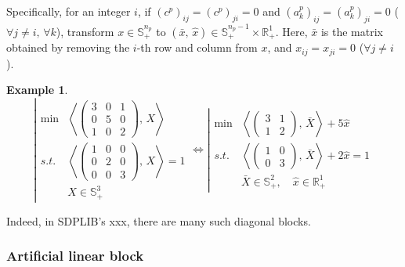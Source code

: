 \documentclass{scrartcl}
\newtheorem{example}{Example}
\newcommand{\inprod}[2]{\left\langle #1, \, #2 \right\rangle}
\begin{document}
Specifically, for an integer $i$,
if $(c^p)_{ij}=(c^p)_{ji}=0$ and $(a^p_k)_{ij}=(a^p_k)_{ji}=0$ 
($\forall j\neq i,\,\forall k$),
transform $x\in \mathbb{S}^{n_p}_+$ to $(\bar{x},\,\hat{x})\in \mathbb{S}^{n_p-1}_+\times \mathbb{R}^1_+$.
Here, $\bar{x}$ is the matrix obtained by removing the $i$-th row and column from $x$, and $x_{ij}= x_{ji}=0$ ($\forall j\neq i$).

\begin{example}
\begin{equation*}
    \left|
    \begin{array}{cl}
        \min & \inprod{\begin{pmatrix}
            3 & 0 & 1 \\
            0 & 5 & 0 \\
            1 & 0 & 2
        \end{pmatrix}}{X} \\
        s.t. 
        & \inprod{\begin{pmatrix}
            1 & 0 & 0 \\ 
            0 & 2 & 0 \\ 
            0 & 0 & 3
        \end{pmatrix}}{X} = 1 \\
        & X\in \mathbb{S}^3_+ 
    \end{array}
    \right.
    \Longleftrightarrow
    \left|
    \begin{array}{cl}
        \min & \inprod{\begin{pmatrix}
            3 & 1 \\
            1 & 2
        \end{pmatrix}}{\bar{X}} + 5\hat{x} \\
        s.t. 
        & \inprod{\begin{pmatrix}
            1 & 0 \\ 0 & 3
        \end{pmatrix}}{\bar{X}} + 2\hat{x} = 1 \\
        & \bar{X}\in \mathbb{S}^2_+, \quad \hat{x} \in \mathbb{R}^1_+
    \end{array}
    \right.
\end{equation*}
\end{example}
Indeed, in SDPLIB's xxx, there are many such diagonal blocks.

\subsubsection{Artificial linear block}
\end{document}

